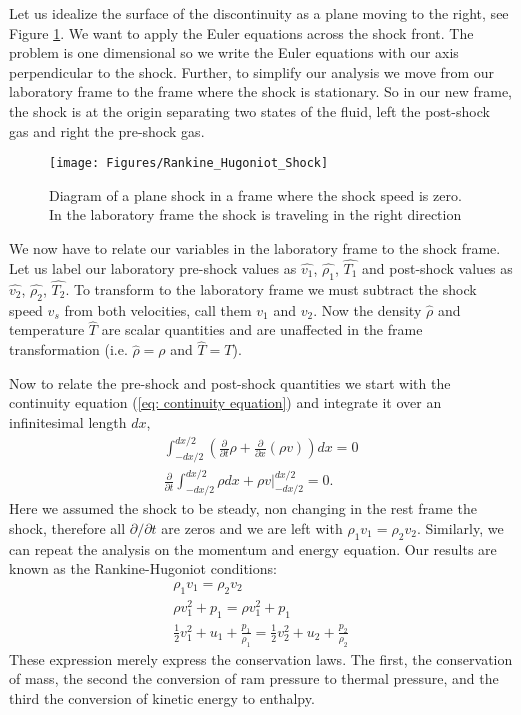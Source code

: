 \documentclass{article}
\begin{document}
Let us idealize the surface of the discontinuity as a plane moving to the right, see Figure \ref{fig: Shock}. We want to apply the Euler equations across the shock front. The problem is one dimensional so we write the Euler equations with our axis perpendicular to the shock. Further, to simplify our analysis we move from our laboratory frame to the frame where the shock is stationary. So in our new frame, the shock is at the origin separating two states of the fluid, left the post-shock gas and right the pre-shock gas.

\begin{figure}[h!]
\begin{center}
\texttt{[image: Figures/Rankine\_Hugoniot\_Shock]}
\end{center}
\caption{Diagram of a plane shock in a frame where the shock speed is zero. In the laboratory frame the shock is traveling in the right direction}
\label{fig: Shock}
\end{figure}

We now have to relate our variables in the laboratory frame to the shock frame. Let us label our laboratory pre-shock values as $\hat{v_1}$, $\hat{\rho_1}$, $\hat{T_1}$ and post-shock values as $\hat{v_2}$, $\hat{\rho_2}$, $\hat{T_2}$. To transform to the laboratory frame we must subtract the shock speed $v_s$ from both velocities, call them $v_1$ and $v_2$. Now the density $\hat{\rho}$ and temperature $\hat{T}$ are scalar quantities and are unaffected in the frame transformation (i.e. $\hat{\rho} = \rho$ and $\hat{T} = T$). 

Now to relate the pre-shock and post-shock quantities we start with the continuity equation (\ref{eq: continuity equation}) and integrate it over an infinitesimal length $dx$,
\begin{gather}
\int_{-dx/2}^{dx/2} \left(\frac{\partial}{\partial t}\rho + \frac{\partial}{\partial x}\left(\rho v\right)\right)dx = 0\\
\frac{\partial}{\partial t} \int_{-dx/2}^{dx/2} \rho dx + \rho v\bigg|_{-dx/2}^{dx/2}=0.
\end{gather} 
Here we assumed the shock to be steady, non changing in the rest frame the shock, therefore all $\partial/\partial t$ are zeros and we are left with $\rho_1 v_1 = \rho_2 v_2$. Similarly, we can repeat the analysis on the momentum and energy equation. Our results are known as the Rankine-Hugoniot conditions:
\begin{gather}
\label{eq: density condition}
\rho_1 v_1 = \rho_2 v_2\\
\label{eq: momentum condition}
\rho v_1^2 +p_1 = \rho v_1^2 +p_1\\
\label{eq: energy condition}
\frac{1}{2} v_1^2 + u_1 + \frac{p_1}{\rho_1} = \frac{1}{2} v_2^2 + u_2 + \frac{p_2}{\rho_2}
\end{gather}
These expression merely express the conservation laws. The first, the conservation of mass, the second the conversion of ram pressure to thermal pressure, and the third the conversion of kinetic energy to enthalpy.
\end{document}
